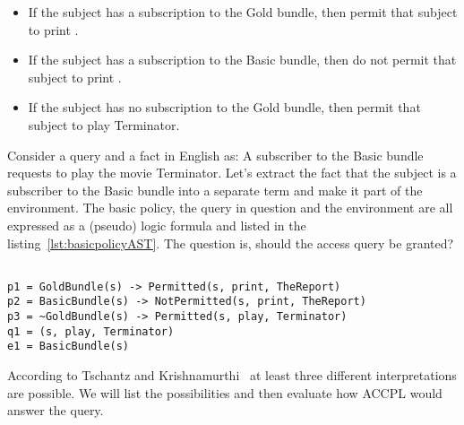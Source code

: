 \begin{itemize}
\item If the subject has a subscription to the Gold bundle, then permit that subject to print .

\item If the subject has a subscription to the Basic bundle, then do not permit that subject to print .

\item If the subject has no subscription to the Gold bundle, then permit that subject to play Terminator.
\end{itemize}

Consider a query and a fact in English as: A subscriber to the Basic bundle requests to play the movie Terminator. Let's extract the fact that the subject is a subscriber to the Basic bundle into a separate term and make it part of the environment. The basic policy, the query in question and the environment are all expressed as a (pseudo) logic formula and listed in the listing~\ref{lst:basicpolicyAST}. The question is, should the access query be granted?

\lstset{mathescape, language=AST}  
\begin{lstlisting}[frame=single, caption={Basic Policy},label={lst:basicpolicyAST}]

p1 = GoldBundle(s) -> Permitted(s, print, TheReport) 
p2 = BasicBundle(s) -> NotPermitted(s, print, TheReport) 
p3 = ~GoldBundle(s) -> Permitted(s, play, Terminator)
q1 = (s, play, Terminator) 
e1 = BasicBundle(s)
\end{lstlisting}


According to Tschantz and Krishnamurthi~\cite{Tschantz} at least three different interpretations are possible. We will list the possibilities and then evaluate how \ac{ACCPL} would answer the query.

